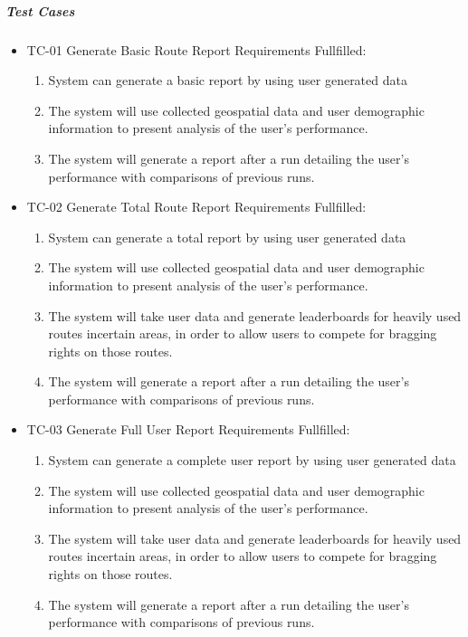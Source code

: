 ﻿\documentclass{article}
\begin{document}
\subparagraph{Test Cases}
\begin{itemize}
\item TC-01 Generate Basic Route Report
  \subitem Requirements Fullfilled:
  \begin{enumerate}
    \item System can generate a basic report by using user generated data
    \item The system will use collected geospatial data and user demographic information to present analysis of the user’s performance.
    \item The system will generate a report after a run detailing the user’s performance with comparisons of previous runs.
  \end{enumerate}
\item TC-02 Generate Total Route Report
  \subitem Requirements Fullfilled:
  \begin{enumerate}
    \item System can generate a total report by using user generated data
    \item The system will use collected geospatial data and user demographic information to present analysis of the user’s performance.
    \item The system will take user data and generate leaderboards for heavily used routes incertain areas, in order to allow users to compete for bragging rights on those routes.
    \item The system will generate a report after a run detailing the user’s performance with comparisons of previous runs.
  \end{enumerate}
\item TC-03 Generate Full User Report
  \subitem Requirements Fullfilled:
  \begin{enumerate}
    \item System can generate a complete user report by using user generated data
    \item The system will use collected geospatial data and user demographic information to present analysis of the user’s performance.
    \item The system will take user data and generate leaderboards for heavily used routes incertain areas, in order to allow users to compete for bragging rights on those routes.
    \item The system will generate a report after a run detailing the user’s performance with comparisons of previous runs.
  \end{enumerate}
\end{itemize}
\end{document}
